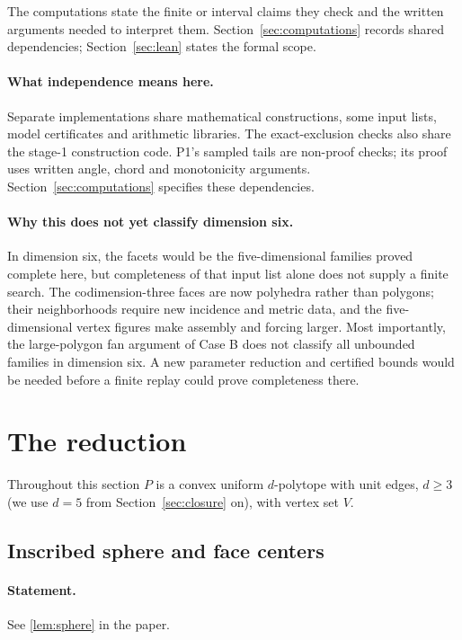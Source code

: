 \documentclass[11pt]{article}
\theoremstyle{definition}
\theoremstyle{remark}
\begin{document}
The computations state the finite or interval claims they check and the
written arguments needed to interpret them. Section~\ref{sec:computations}
records shared dependencies; Section~\ref{sec:lean} states the formal scope.

\paragraph{What independence means here.}
Separate implementations share mathematical constructions, some input lists,
model certificates and arithmetic libraries. The exact-exclusion checks
also share the stage-1 construction code. P1's sampled tails are non-proof
checks; its proof uses written angle, chord and monotonicity arguments.
Section~\ref{sec:computations} specifies these dependencies.

\paragraph{Why this does not yet classify dimension six.}
In dimension six, the facets would be the five-dimensional families proved
complete here, but completeness of that input list alone does not supply a
finite search. The codimension-three faces are now polyhedra rather than
polygons; their neighborhoods require new incidence and metric data, and
the five-dimensional vertex figures make assembly and forcing larger.
Most importantly, the large-polygon fan argument of Case B does not classify
all unbounded families in dimension six. A new parameter reduction and
certified bounds would be needed before a finite replay could prove
completeness there.

\section{The reduction}\label{sec:prelim}

Throughout this section $P$ is a convex uniform $d$-polytope with unit
edges, $d\ge3$ (we use $d=5$ from Section~\ref{sec:closure} on), with
vertex set $V$.

\subsection{Inscribed sphere and face centers}

\paragraph{Statement.} See \ref{lem:sphere} in the paper.
\end{document}
